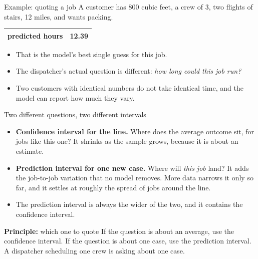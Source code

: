\documentclass[aspectratio=169]{beamer}
\newenvironment{principle}[1]{\begin{block}{\textbf{Principle:} #1}}{\end{block}}
\begin{document}
\begin{frame}{Example: quoting a job}
A customer has 800 cubic feet, a crew of 3, two flights of stairs, 12 miles, and wants packing.
\begin{center}\small
\begin{tabular}{lr}
\toprule
predicted hours & 12.39 \\
\bottomrule
\end{tabular}
\end{center}
\begin{itemize}
  \item That is the model's best single guess for this job.
  \item The dispatcher's actual question is different: \emph{how long could this job run?}
  \item Two customers with identical numbers do not take identical time, and the model can
        report how much they vary.
\end{itemize}
\end{frame}

\begin{frame}{Two different questions, two different intervals}
\begin{itemize}
  \item \textbf{Confidence interval for the line.} Where does the average outcome sit, for jobs
        like this one? It shrinks as the sample grows, because it is about an estimate.
  \item \textbf{Prediction interval for one new case.} Where will \emph{this job} land? It adds
        the job-to-job variation that no model removes. More data narrows it only so far, and it
        settles at roughly the spread of jobs around the line.
  \item The prediction interval is always the wider of the two, and it contains the confidence
        interval.
\end{itemize}
\begin{principle}{which one to quote}
If the question is about an average, use the confidence interval. If the question is about one
case, use the prediction interval. A dispatcher scheduling one crew is asking about one case.
\end{principle}
\end{frame}
\end{document}
